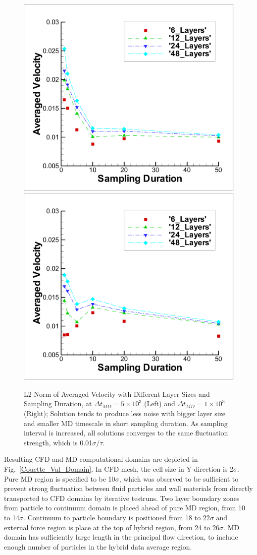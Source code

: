 \documentclass{CFD2010paper}
\begin{document}
%
\begin{figure}[ht]
\centering
\includegraphics[width=0.4\linewidth]{MD_Regular_Vel0_5e-3.pdf}
\hskip 1cm
\includegraphics[width=0.4\linewidth]{MD_Regular_Vel0_1e-3.pdf}
\vskip-0.2cm
\caption{L2 Norm of Averaged Velocity with Different Layer Sizes and Sampling Duration, at $\Delta{t_{MD}}=5\times{10^{3}}$ (Left) and $\Delta{t_{MD}}=1\times{10^{3}}$ (Right); Solution tends to produce less noise with bigger layer size and smaller MD timescale in short sampling duration. As sampling interval is increased, all solutions converges to the same fluctuation strength, which is 0.01$\sigma/\tau$.}
\label{MD_Regular_Vel0}
\end{figure}



Resulting CFD and MD computational domains are depicted in Fig.~\ref{Couette_Val_Domain}. In CFD mesh, the cell size in Y-direction is 2$\sigma$. Pure MD region is specified to be 10$\sigma$, which was observed to be sufficient to prevent strong fluctuation between fluid particles and wall materials from directly transported to CFD domains by iterative testruns. Two layer boundary zones from particle to continuum domain is placed ahead of pure MD region, from 10 to 14$\sigma$. Continuum to particle boundary is positioned from 18 to 22$\sigma$ and external force region is place at the top of hybrid region, from 24 to 26$\sigma$. MD domain has sufficiently large length in the principal flow direction, to include enough number of particles in the hybrid data average region.
\end{document}
